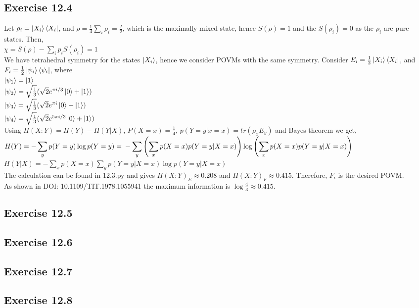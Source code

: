 \documentclass[a4paper,12pt]{article}
\begin{document}
\subsection*{Exercise 12.4}
Let $\rho_i=\ket{X_i}\bra{X_i}$, and  $\rho=\frac{1}{4}\sum_i\rho_i=\frac{I}{2}$, which
is the maximally mixed state, hence $S(\rho)=1$ and the $S(\rho_i)=0$ as the $\rho_i$ are
pure states. Then,\\
$\chi=S(\rho)-\displaystyle\sum_ip_iS(\rho_i)=1$\\
We have tetrahedral symmetry for the states $\ket{X_i}$, hence we consider POVMs with 
the same symmetry. Consider $E_i=\frac{1}{2}\ket{X_i}\bra{X_i}$, and $F_i=\frac{1}{2}\ket{\psi_i}\bra{\psi_i}$,
where\\
$\ket{\psi_1}=\ket{1}$\\
$\ket{\psi_2}=\sqrt{\frac{1}{3}}(\sqrt{2}e^{\pi i/3}\ket{0}+\ket{1})$\\
$\ket{\psi_3}=\sqrt{\frac{1}{3}}(\sqrt{2}e^{\pi i}\ket{0}+\ket{1})$\\
$\ket{\psi_4}=\sqrt{\frac{1}{3}}(\sqrt{2}e^{5\pi i/3}\ket{0}+\ket{1})$\\
Using $H(X:Y)=H(Y)-H(Y|X)$, $P(X=x)=\frac{1}{4}$, $p(Y=y|x=x)=tr(\rho_xE_y)$ and
Bayes theorem we get,\\
$H(Y)=-\displaystyle\sum_yp(Y=y)\log{p(Y=y)}=\\
-\sum_y\left(\sum_xp(X=x)p(Y=y|X=x)\right)\log{\left(\sum_xp(X=x)p(Y=y|X=x)\right)}$\\
$H(Y|X)=\displaystyle - \sum_xp(X=x)\sum_yp(Y=y|X=x)\log{p(Y=y|X=x)}$\\
The calculation can be found in 12.3.py and gives $H(X:Y)_E\approx 0.208$ and
$H(X:Y)_F\approx 0.415$. Therefore, ${F_i}$ is the desired POVM.\\
As shown in DOI: 10.1109/TIT.1978.1055941 the maximum information is $\log{\frac{4}{3}}\approx 0.415$.
\subsection*{Exercise 12.5}

\subsection*{Exercise 12.6}
\subsection*{Exercise 12.7}
\subsection*{Exercise 12.8}
\end{document}
